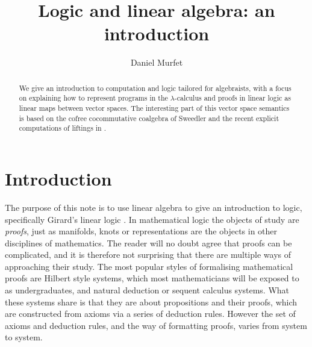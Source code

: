 \documentclass[english,letter paper,12pt,reqno]{article}
\theoremstyle{example}
\numberwithin{equation}{section}
\def\res{\operatorname{Res}}
\begin{document}
\def\ScoreOverhang{1pt}

\def\Res{\res\!}
\newcommand{\ud}[1]{\operatorname{d}\!{#1}}
\newcommand{\Ress}[1]{\res_{#1}\!}
\newcommand{\cat}[1]{\mathcal{#1}}
\newcommand{\lto}{\longrightarrow}
\newcommand{\xlto}[1]{\stackrel{#1}\lto}
\newcommand{\mf}[1]{\mathfrak{#1}}
\newcommand{\md}[1]{\mathscr{#1}}
\newcommand{\church}[1]{\underline{#1}}
\newcommand{\prf}[1]{\underline{#1}}
\newcommand{\den}[1]{\llbracket #1 \rrbracket}
\def\l{\,|\,}
\def\sgn{\textup{sgn}}
\def\cont{\operatorname{cont}}

\title{Logic and linear algebra: an introduction}
\author{Daniel Murfet}

\maketitle

\begin{abstract} We give an introduction to computation and logic tailored for algebraists, with a focus on explaining how to represent programs in the $\lambda$-calculus and proofs in linear logic as linear maps between vector spaces. The interesting part of this vector space semantics is based on the cofree cocommutative coalgebra of Sweedler \cite{sweedler} and the recent explicit computations of liftings in \cite{murfet_coalg}.
\end{abstract}

\section{Introduction}

The purpose of this note is to use linear algebra to give an introduction to logic, specifically Girard's linear logic \cite{girard_llogic}. In mathematical logic the objects of study are \emph{proofs}, just as manifolds, knots or representations are the objects in other disciplines of mathematics. The reader will no doubt agree that proofs  can be complicated, and it is therefore not surprising that there are multiple ways of approaching their study. The most popular styles of formalising mathematical proofs are Hilbert style systems, which most mathematicians will be exposed to as undergraduates, and natural deduction or sequent calculus systems. What these systems share is that they are about propositions and their proofs, which are constructed from axioms via a series of deduction rules. However the set of axioms and deduction rules, and the way of formatting proofs, varies from system to system. 
\end{document}
